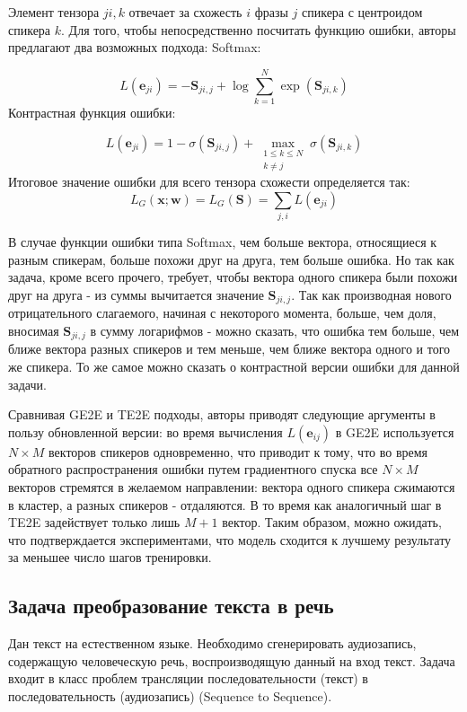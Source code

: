 \documentclass[oneside,final,14pt]{extreport}
\begin{document}
Элемент тензора $ji,k$ отвечает за схожесть $i$ фразы $j$ спикера с центроидом спикера $k$. Для того, чтобы непосредственно посчитать функцию ошибки, авторы\cite{bib:e2e_speaker_ver_loss} предлагают два возможных подхода:
Softmax:

\begin{equation}
L\left(\mathbf{e}_{j i}\right)=-\mathbf{S}_{j i, j}+\log \sum_{k=1}^{N} \exp \left(\mathbf{S}_{j i, k}\right)
\end{equation}
Контрастная функция ошибки:

\begin{equation}
L\left(\mathbf{e}_{j i}\right)=1-\sigma\left(\mathbf{S}_{j i, j}\right)+\max _{\substack{1 \leq k \leq N \\ k \neq j}} \sigma\left(\mathbf{S}_{j i, k}\right)
\end{equation}
Итоговое значение ошибки для всего тензора схожести определяется так:
$$
\begin{equation}
L_{G}(\mathbf{x} ; \mathbf{w})=L_{G}(\mathbf{S})=\sum_{j, i} L\left(\mathbf{e}_{j i}\right)
\end{equation}
$$

В случае функции ошибки типа Softmax, чем больше вектора, относящиеся к разным спикерам, больше похожи друг на друга, тем больше ошибка. Но так как задача, кроме всего прочего, требует, чтобы вектора одного спикера были похожи друг на друга - из суммы вычитается значение $\mathbf{S}_{j i, j}$. Так как производная нового отрицательного слагаемого, начиная с некоторого момента, больше, чем доля, вносимая  $\mathbf{S}_{j i, j}$ в сумму логарифмов - можно сказать, что ошибка тем больше, чем ближе вектора разных спикеров и тем меньше, чем ближе вектора одного и того же спикера. То же самое можно сказать о контрастной версии ошибки для данной задачи.

Сравнивая GE2E  и TE2E подходы, авторы приводят следующие аргументы в пользу обновленной версии: во время вычисления $L(\mathbf{e}_{ij})$ в GE2E используется $N \times M$ векторов спикеров одновременно, что приводит к тому, что во время обратного распространения ошибки путем градиентного спуска все $N \times M $ векторов стремятся в желаемом направлении: вектора одного спикера сжимаются в кластер, а разных спикеров - отдаляются. В то время как аналогичный шаг в TE2E задействует только лишь $M + 1$ вектор. Таким образом, можно ожидать, что подтверждается экспериментами, что модель сходится к лучшему результату за меньшее число шагов тренировки.


\subsection{Задача преобразование текста в речь}
Дан текст на естественном языке. Необходимо сгенерировать аудиозапись, содержащую человеческую речь, воспроизводящую данный на вход текст.  Задача входит в класс проблем трансляции последовательности (текст) в последовательность (аудиозапись) (Sequence to Sequence). 
\end{document}
